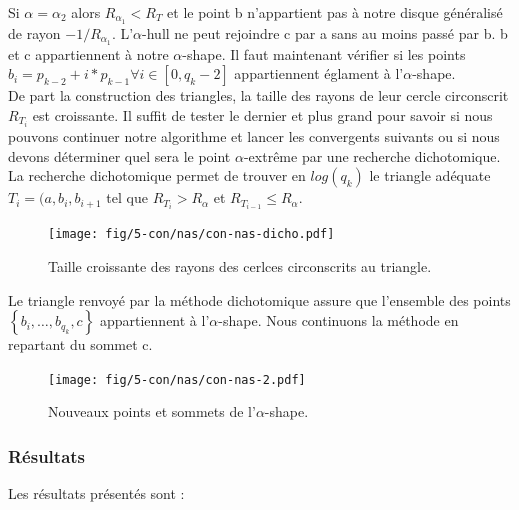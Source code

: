 Si $\alpha = \alpha_{2}$ alors \textbf{$R_{\alpha_{1}} < R_T$} et le point b n'appartient pas à notre disque généralisé de rayon $-1/R_{\alpha_{1}}$. L'$\alpha$-hull ne peut rejoindre c par a sans au moins passé par b. b et c appartiennent à notre $\alpha$-shape. Il faut maintenant vérifier si les points $b_i = p_{k-2} + i*p_{k-1} \forall i \in [0, q_k-2]$ appartiennent églament à l'$\alpha$-shape. \\

De part la construction des triangles, la taille des rayons de leur cercle circonscrit $R_{T_{i}}$ est croissante. Il suffit de tester le dernier et plus grand pour savoir si nous pouvons continuer notre algorithme et lancer les convergents suivants ou si nous devons déterminer quel sera le point $\alpha$-extrême par une recherche dichotomique. La recherche dichotomique permet de trouver en $log(q_k)$ le triangle adéquate $T_i = (a, b_{i}, b_{i+1}$ tel que $R_{T_i} > R_{\alpha}$ et $R_{T_{i-1}} \leq R_{\alpha}$.

\begin{figure}[H]
  \centering
  \texttt{[image: fig/5-con/nas/con-nas-dicho.pdf]}
  \caption{Taille croissante des rayons des cerlces circonscrits au triangle.}
\end{figure}

Le triangle renvoyé par la méthode dichotomique assure que l'ensemble des points $\left\{ b_{i},\ldots, b_{q_k}, c \right\}$ appartiennent à l'$\alpha$-shape. Nous continuons la méthode en repartant du sommet c.
 
\begin{figure}[H]
  \centering
  \texttt{[image: fig/5-con/nas/con-nas-2.pdf]}
  \caption{Nouveaux points et sommets de l'$\alpha$-shape.}
\end{figure}


\subsubsection{Résultats}

Les résultats présentés sont : 

